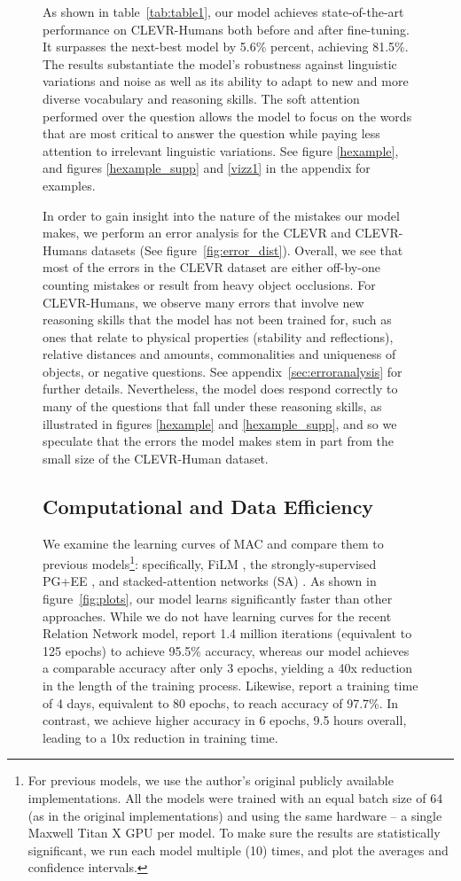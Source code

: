 \documentclass[fleqn]{article}
\newcommand{\figref}[1]{figure~\ref{fig:#1}}
\newcommand{\tabref}[1]{table~\ref{tab:#1}}
\newcommand{\appref}[1]{appendix~\ref{sec:#1}}
\begin{document}
\begin{figure}[t]
\begin{minipage}{0.55\textwidth}
As shown in \tabref{table1}, our model achieves state-of-the-art performance on CLEVR-Humans both before and after fine-tuning. It surpasses the next-best model by 5.6\% percent, achieving 81.5\%. The results substantiate the model's robustness against linguistic variations and noise as well as its ability to adapt to new and more diverse vocabulary and reasoning skills. The soft attention performed over the question allows the model to focus on the words that are most critical to answer the question while paying less attention to irrelevant linguistic variations. See figure \ref{hexample}, and figures \ref{hexample_supp} and \ref{vizz1} in the appendix for examples. 

In order to gain insight into the nature of the mistakes our model makes, we perform an error analysis for the CLEVR and CLEVR-Humans datasets (See \figref{error_dist}). Overall, we see that most of the errors in the CLEVR dataset are either off-by-one counting mistakes or result from heavy object occlusions. For CLEVR-Humans, we observe many errors that involve new reasoning skills that the model has not been trained for, such as ones that relate to physical properties (stability and reflections), relative distances and amounts, commonalities and uniqueness of objects, or negative questions. See \appref{erroranalysis} for further details. Nevertheless, the model does respond correctly to many of the questions that fall under these reasoning skills, as illustrated in figures \ref{hexample} and \ref{hexample_supp}, and so we speculate that the errors the model makes stem in part from the small size of the CLEVR-Human dataset.

\subsection{Computational and Data Efficiency}

We examine the learning curves of MAC and compare them to previous models\footnote{For previous models, we use the author's original publicly available implementations. All the models were trained with an equal batch size of 64 (as in the original implementations) and using the same hardware -- a single Maxwell Titan X GPU per model. To make sure the results are statistically significant, we run each model multiple (10) times, and plot the averages and confidence intervals.}: specifically, FiLM \citep{film}, the strongly-supervised PG+EE \citep{pgee}, and stacked-attention networks (SA) \citep{pgee, saAtt}. As shown in \figref{plots}, our model learns significantly faster than other approaches. While we do not have learning curves for the recent Relation Network model, \citet{rn} report 1.4 million iterations (equivalent to 125 epochs) to achieve 95.5\% accuracy, whereas our model achieves a comparable accuracy after only 3 epochs, yielding a 40x reduction in the length of the training process. Likewise, \citet{film} report a training time of 4 days, equivalent to 80 epochs, to reach accuracy of 97.7\%. In contrast, we achieve higher accuracy in 6 epochs, 9.5 hours overall, leading to a 10x reduction in training time.


\end{minipage}
\end{figure}
\end{document}
